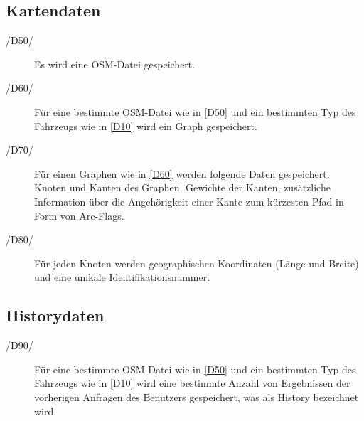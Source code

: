 \documentclass[a4paper, 11pt]{article}
\begin{document}
\subsection{Kartendaten}
\begin{description}
\item [/D50/\label{D50}]
Es wird eine OSM-Datei gespeichert.
\item [/D60/\label{D60}]
Für eine bestimmte OSM-Datei wie in \ref{D50} und ein bestimmten Typ des Fahrzeugs wie in \ref{D10} wird ein Graph gespeichert.
\item [/D70/]
Für einen Graphen wie in \ref{D60} werden  folgende Daten gespeichert:\\
Knoten und Kanten des Graphen, Gewichte der Kanten, zusätzliche Information über die Angehörigkeit einer Kante zum kürzesten Pfad in Form von Arc-Flags.
\item [/D80/]
Für jeden Knoten werden geographischen Koordinaten (Länge und Breite) und eine unikale Identifikationsnummer.
\end{description}

\subsection{Historydaten}
\begin{description}
\item [/D90/]
Für eine bestimmte OSM-Datei wie in \ref{D50} und ein bestimmten Typ des Fahrzeugs wie in \ref{D10} wird eine bestimmte Anzahl von Ergebnissen der vorherigen Anfragen des Benutzers gespeichert, was als History bezeichnet wird.  
\end{description}
\end{document}
